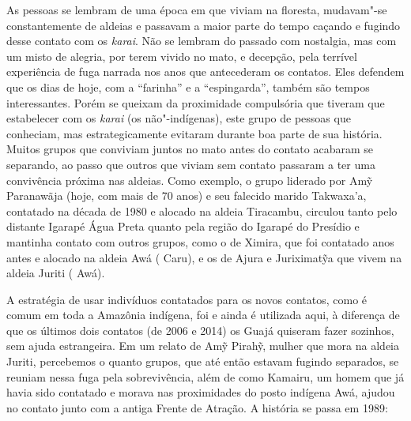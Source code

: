 As pessoas se lembram de uma época em que viviam na floresta, mudavam"-se
constantemente de aldeias e passavam a maior parte do tempo caçando e
fugindo desse contato com os \emph{karai}. Não se lembram do passado com
nostalgia, mas com um misto de alegria, por terem vivido no mato, e
decepção, pela terrível experiência de fuga narrada nos anos que
antecederam os contatos. Eles defendem que os dias de hoje, com a
``farinha'' e a ``espingarda'', também são tempos interessantes. Porém
se queixam da proximidade compulsória que tiveram que estabelecer com os
\emph{karai} (os não"-indígenas), este grupo de pessoas que conheciam,
mas estrategicamente evitaram durante boa parte de sua história. Muitos
grupos que conviviam juntos no mato antes do contato acabaram se
separando, ao passo que outros que viviam sem contato passaram a ter uma
convivência próxima nas aldeias. Como exemplo, o grupo liderado por Amỹ
Paranawãja (hoje, com mais de 70 anos) e seu falecido marido Takwaxa'a,
contatado na década de 1980 e alocado na aldeia Tiracambu, circulou
tanto pelo distante Igarapé Água Preta quanto pela região do Igarapé do
Presídio e mantinha contato com outros grupos, como o de Ximira, que foi
contatado anos antes e alocado na aldeia Awá ( Caru), e os de
Ajura e Juriximatỹa que vivem na aldeia Juriti ( Awá).

A estratégia de usar indivíduos contatados para os novos contatos, como
é comum em toda a Amazônia indígena, foi e ainda é utilizada aqui, à
diferença de que os últimos dois contatos (de 2006 e 2014) os Guajá
quiseram fazer sozinhos, sem ajuda estrangeira. Em um relato de Amỹ
Pirahỹ, mulher que mora na aldeia Juriti, percebemos o quanto grupos,
que até então estavam fugindo separados, se reuniam nessa fuga pela
sobrevivência, além de como Kamairu, um homem que já havia sido
contatado e morava nas proximidades do posto indígena Awá, ajudou
no contato junto com a antiga Frente de Atração. A história se passa em
1989:

